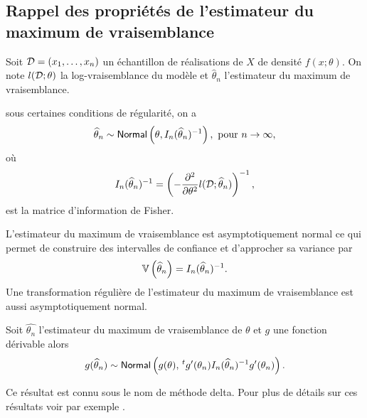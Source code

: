 \subsection{Rappel des propriétés de l'estimateur du maximum de vraisemblance}
Soit $\mathcal{D} = (x_1,\ldots, x_n)$ un échantillon \iid de réalisations de $X$ \va de densité $f(x;\theta)$. On note $l(\mathcal{D} ; \theta)$ la log-vraisemblance du modèle et $\widehat{\theta}_n$ l'estimateur du maximum de vraisemblance.
\begin{theo}
sous certaines conditions de régularité, on a
$$
\widehat{\theta}_n\sim \mathsf{Normal}\left(\theta,I_n(\widehat{\theta}_n)^{-1}\right),\text{ pour } n\rightarrow\infty,
$$
où 
$$
I_n(\widehat{\theta}_n)^{-1} =  \left(-\frac{\partial^2}{\partial\theta^2}l(\mathcal{D};\widehat{\theta}_n)\right)^{-1},
$$
est la matrice d'information de Fisher.
\end{theo}
L'estimateur du maximum de vraisemblance est asymptotiquement normal ce qui permet de construire des intervalles de confiance et d'approcher sa variance par
$$
\mathbb{V}\left(\widehat{\theta}_n\right) = I_n(\widehat{\theta}_n)^{-1}.
$$
Une transformation régulière de l'estimateur du maximum de vraisemblance est aussi asymptotiquement normal.
\begin{prop}
Soit $\widehat{\theta_n}$ l'estimateur du maximum de vraisemblance de $\theta$ et $g$ une fonction dérivable alors 
$$
g(\widehat{\theta}_n)\sim\mathsf{Normal}\left(g(\theta), \,^tg'(\theta_n)I_n(\widehat{\theta}_n)^{-1}g'(\theta_n)\right).
$$
\end{prop}
Ce résultat est connu sous le nom de méthode delta. Pour plus de détails sur ces résultats voir par exemple \cite[Chapitre 9]{Wasserman2013}.
